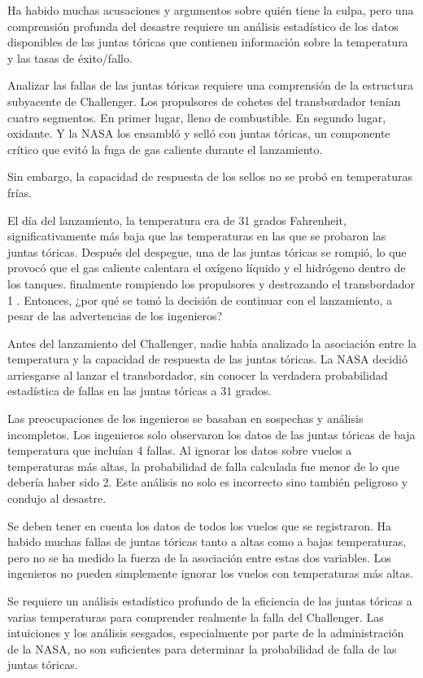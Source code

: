 Ha habido muchas acusaciones y argumentos sobre quién tiene la culpa, pero una
comprensión profunda del desastre requiere un análisis estadístico de los datos
disponibles de las juntas tóricas que contienen información sobre la temperatura
y las tasas de éxito/fallo.

Analizar las fallas de las juntas tóricas requiere una comprensión de la
estructura subyacente de Challenger. Los propulsores de cohetes del
transbordador tenían cuatro segmentos. En primer lugar, lleno de combustible. En
segundo lugar, oxidante. Y la NASA los ensambló y selló con juntas tóricas, un
componente crítico que evitó la fuga de gas caliente durante el lanzamiento.


Sin embargo, la capacidad de respuesta de los sellos no se probó en temperaturas
frías.


El día del lanzamiento, la temperatura era de 31 grados Fahrenheit,
significativamente más baja que las temperaturas en las que se probaron las
juntas tóricas. Después del despegue, una de las juntas tóricas se rompió, lo
que provocó que el gas caliente calentara el oxígeno líquido y el hidrógeno
dentro de los tanques. finalmente rompiendo los propulsores y destrozando el
transbordador 1 . Entonces, ¿por qué se tomó la decisión de continuar con el
lanzamiento, a pesar de las advertencias de los ingenieros?


Antes del lanzamiento del Challenger, nadie había analizado la asociación entre
la temperatura y la capacidad de respuesta de las juntas tóricas. La NASA
decidió arriesgarse al lanzar el transbordador, sin conocer la verdadera
probabilidad estadística de fallas en las juntas tóricas a 31 grados.

Las preocupaciones de los ingenieros se basaban en sospechas y análisis
incompletos. Los ingenieros solo observaron los datos de las juntas tóricas de
baja temperatura que incluían 4 fallas. Al ignorar los datos sobre vuelos a
temperaturas más altas, la probabilidad de falla calculada fue menor de lo que
debería haber sido 2. Este análisis no solo es incorrecto sino también
peligroso y condujo al desastre.

Se deben tener en cuenta los datos de todos los vuelos que se registraron. Ha
habido muchas fallas de juntas tóricas tanto a altas como a bajas temperaturas,
pero no se ha medido la fuerza de la asociación entre estas dos variables. Los
ingenieros no pueden simplemente ignorar los vuelos con temperaturas más
altas.

Se requiere un análisis estadístico profundo de la eficiencia de las juntas
tóricas a varias temperaturas para comprender realmente la falla del Challenger.
Las intuiciones y los análisis sesgados, especialmente por parte de la
administración de la NASA, no son suficientes para determinar la probabilidad de
falla de las juntas tóricas.

